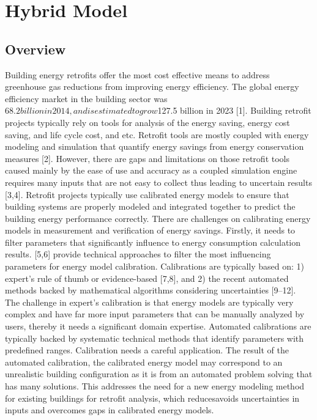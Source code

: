 \section{Hybrid Model}\label{hybrid-model}

\subsection{Overview}\label{overview-004}

Building energy retrofits offer the most cost effective means to address greenhouse gas reductions from improving energy efficiency. The global energy efficiency market in the building sector was $68.2 billion in 2014, and is estimated to grow $127.5 billion in 2023 [1]. Building retrofit projects typically rely on tools for analysis of the energy saving, energy cost saving, and life cycle cost, and etc. Retrofit tools are mostly coupled with energy modeling and simulation that quantify energy savings from energy conservation measures [2]. However, there are gaps and limitations on those retrofit tools caused mainly by the ease of use and accuracy as a coupled simulation engine requires many inputs that are not easy to collect thus leading to uncertain results [3,4]. 
Retrofit projects typically use calibrated energy models to ensure that building systems are properly modeled and integrated together to predict the building energy performance correctly. There are challenges on calibrating energy models in measurement and verification of energy savings. Firstly, it needs to filter parameters that significantly influence to energy consumption calculation results. [5,6] provide technical approaches to filter the most influencing parameters for energy model calibration. Calibrations are typically based on: 1) expert’s rule of thumb or evidence-based [7,8], and 2) the recent automated methods backed by mathematical algorithms considering uncertainties [9–12]. The challenge in expert’s calibration is that energy models are typically very complex and have far more input parameters that can be manually analyzed by users, thereby it needs a significant domain expertise. Automated calibrations are typically backed by systematic technical methods that identify parameters with predefined ranges. Calibration needs a careful application. The result of the automated calibration, the calibrated energy model may correspond to an unrealistic building configuration as it is from an automated problem solving that has many solutions. This addresses the need for a new energy modeling method for existing buildings for retrofit analysis, which reducesavoids uncertainties in inputs and overcomes gaps in calibrated energy models.
